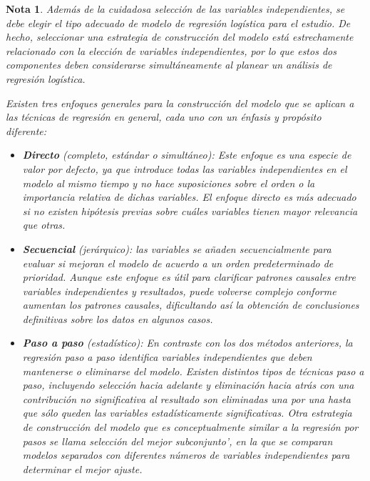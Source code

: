 \documentclass[12pt]{article}
\newtheorem{Note}{Nota}%
\begin{document}
\begin{Note}
Adem\'as de la cuidadosa selecci\'on de las variables independientes, se debe elegir el tipo adecuado de modelo de regresi\'on log\'istica para el estudio. De hecho, seleccionar una estrategia de construcci\'on del modelo est\'a estrechamente relacionado con la elecci\'on de variables independientes, por lo que estos dos componentes deben considerarse simult\'aneamente al planear un an\'alisis de regresi\'on log\'istica.

Existen tres enfoques generales para la construcci\'on del modelo que se aplican a las t\'ecnicas de regresi\'on en general, cada uno con un \'enfasis y prop\'osito diferente: 
\begin{itemize}
\item[a) ] \textbf{Directo} (completo, est\'andar o simult\'aneo): Este enfoque es una especie de valor por defecto, ya que introduce todas las variables independientes en el modelo al mismo tiempo y no hace suposiciones sobre el orden o la importancia relativa de dichas variables. El enfoque directo es m\'as adecuado si no existen hip\'otesis previas sobre cu\'ales variables tienen mayor relevancia que otras. 

\item[ b) ] \textbf{Secuencial} (jer\'arquico):  las variables se a\~naden secuencialmente para evaluar si mejoran el modelo de acuerdo a un orden predeterminado de prioridad. Aunque este enfoque es \'util para clarificar patrones causales entre variables independientes y resultados, puede volverse complejo conforme aumentan los patrones causales, dificultando as\'i la obtenci\'on de conclusiones definitivas sobre los datos en algunos casos.

\item[c) ] \textbf{Paso a paso} (estad\'istico): En contraste con los dos m\'etodos anteriores, la regresi\'on paso a paso identifica variables independientes que deben mantenerse o eliminarse del modelo. Existen distintos tipos de t\'ecnicas paso a paso, incluyendo selecci\'on hacia adelante y eliminaci\'on hacia atr\'as con una contribuci\'on no significativa al resultado son eliminadas una por una hasta que s\'olo queden las variables estad\'isticamente significativas. Otra estrategia de construcci\'on del modelo que es conceptualmente similar a la regresi\'on por pasos se llama \textit{selecci\'on del mejor subconjunto'}, en la que se comparan modelos separados con diferentes n\'umeros de variables independientes para determinar el mejor ajuste.
\end{itemize}


\end{Note}
\end{document}
